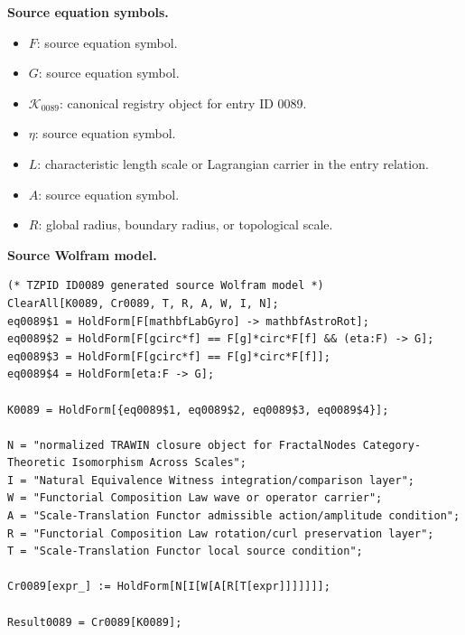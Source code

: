 \begin{minipage}[t]{0.49\linewidth}
\begingroup
\small
\raggedright
\textbf{Source equation symbols.}\par
\begin{itemize}[leftmargin=1.35em,itemsep=1pt,topsep=1pt,parsep=0pt]
    \item $F$: source equation symbol.
    \item $G$: source equation symbol.
    \item $\mathcal{K}_{0089}$: canonical registry object for entry ID 0089.
    \item $\eta$: source equation symbol.
    \item $L$: characteristic length scale or Lagrangian carrier in the entry relation.
    \item $A$: source equation symbol.
    \item $R$: global radius, boundary radius, or topological scale.
\end{itemize}
\endgroup
\end{minipage}\hfill
\begin{minipage}[t]{0.47\linewidth}
\begingroup
\scriptsize
\raggedright
\textbf{Source Wolfram model.}\par
\begin{Verbatim}[fontsize=\tiny,breaklines=true,breakanywhere=true]
(* TZPID ID0089 generated source Wolfram model *)
ClearAll[K0089, Cr0089, T, R, A, W, I, N];
eq0089$1 = HoldForm[F[mathbfLabGyro] -> mathbfAstroRot];
eq0089$2 = HoldForm[F[gcirc*f] == F[g]*circ*F[f] && (eta:F) -> G];
eq0089$3 = HoldForm[F[gcirc*f] == F[g]*circ*F[f]];
eq0089$4 = HoldForm[eta:F -> G];

K0089 = HoldForm[{eq0089$1, eq0089$2, eq0089$3, eq0089$4}];

N = "normalized TRAWIN closure object for FractalNodes Category-Theoretic Isomorphism Across Scales";
I = "Natural Equivalence Witness integration/comparison layer";
W = "Functorial Composition Law wave or operator carrier";
A = "Scale-Translation Functor admissible action/amplitude condition";
R = "Functorial Composition Law rotation/curl preservation layer";
T = "Scale-Translation Functor local source condition";

Cr0089[expr_] := HoldForm[N[I[W[A[R[T[expr]]]]]]];

Result0089 = Cr0089[K0089];
\end{Verbatim}
\endgroup
\end{minipage}

